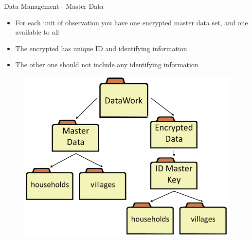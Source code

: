 \documentclass[aspectratio=169]{beamer}
\begin{document}
\begin{frame}[fragile]{Data Management - Master Data}
\begin{multicols}{2}	
	\begin{itemize}
		\item For each unit of observation you have one encrypted master data set, and one available to all
		\item The encrypted has unique ID and identifying information
		\item The other one should not include any identifying information
	\end{itemize}
	\begin{figure}
		\centering
		\includegraphics[width=\linewidth]{img/datamanage1}
	\end{figure}
\end{multicols}
\end{frame}
\end{document}
